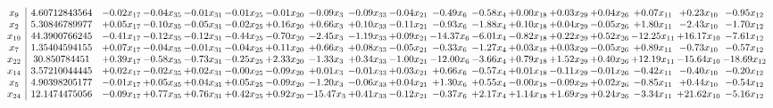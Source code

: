\documentclass[9pt]{article}
\begin{document}
 \[\begin{array}{c| c c@{\hskip 2pt} c@{\hskip 2pt} c@{\hskip 2pt} c@{\hskip 2pt} c@{\hskip 2pt} c@{\hskip 2pt} c@{\hskip 2pt} c@{\hskip 2pt} c@{\hskip 2pt} c@{\hskip 2pt} c@{\hskip 2pt} c@{\hskip 2pt} c@{\hskip 2pt} c@{\hskip 2pt} c@{\hskip 2pt} c@{\hskip 2pt} }
 x_{9}   &  4.60712843564 & -0.02 x_{17} & -0.04 x_{35} & -0.01 x_{31} & -0.01 x_{25} & -0.01 x_{20} & -0.09 x_{3} & -0.09 x_{33} & -0.04 x_{21} & -0.49 x_{6} & -0.58 x_{4} & +  0.00 x_{18} & +  0.03 x_{29} & +  0.04 x_{26} & +  0.07 x_{11} & +  0.23 x_{10} & -0.95 x_{12}\\
 x_{2}   &  5.30846789977 & +  0.05 x_{17} & -0.10 x_{35} & -0.05 x_{31} & -0.02 x_{25} & +  0.16 x_{20} & +  0.66 x_{3} & +  0.10 x_{33} & -0.11 x_{21} & -0.93 x_{6} & -1.88 x_{4} & +  0.10 x_{18} & +  0.04 x_{29} & -0.05 x_{26} & +  1.80 x_{11} & -2.43 x_{10} & -1.70 x_{12}\\
 x_{19}   &  44.3900766245 & -0.41 x_{17} & -0.12 x_{35} & -0.12 x_{31} & -0.44 x_{25} & -0.70 x_{20} & -2.45 x_{3} & -1.19 x_{33} & +  0.09 x_{21} & -14.37 x_{6} & -6.01 x_{4} & -0.82 x_{18} & +  0.22 x_{29} & +  0.52 x_{26} & -12.25 x_{11} & + 16.17 x_{10} & -7.61 x_{12}\\
 x_{7}   &  1.35404594155 & +  0.07 x_{17} & -0.04 x_{35} & -0.01 x_{31} & -0.04 x_{25} & +  0.11 x_{20} & +  0.66 x_{3} & +  0.08 x_{33} & -0.05 x_{21} & -0.33 x_{6} & -1.27 x_{4} & +  0.03 x_{18} & +  0.03 x_{29} & -0.05 x_{26} & +  0.89 x_{11} & -0.73 x_{10} & -0.57 x_{12}\\
 x_{22}   &  30.850784451 & +  0.39 x_{17} & -0.58 x_{35} & -0.73 x_{31} & -0.25 x_{25} & +  2.33 x_{20} & -1.33 x_{3} & +  0.34 x_{33} & -1.00 x_{21} & -12.00 x_{6} & -3.66 x_{4} & +  0.79 x_{18} & +  1.52 x_{29} & +  0.40 x_{26} & + 12.19 x_{11} & -15.64 x_{10} & -18.69 x_{12}\\
 x_{14}   &  3.57210044445 & +  0.02 x_{17} & -0.02 x_{35} & +  0.02 x_{31} & -0.00 x_{25} & -0.09 x_{20} & +  0.01 x_{3} & -0.01 x_{33} & +  0.03 x_{21} & +  0.66 x_{6} & -0.57 x_{4} & +  0.01 x_{18} & -0.11 x_{29} & -0.01 x_{26} & -0.42 x_{11} & -0.40 x_{10} & -0.20 x_{12}\\
 x_{5}   &  4.90398205177 & -0.01 x_{17} & +  0.05 x_{35} & +  0.04 x_{31} & +  0.05 x_{25} & -0.09 x_{20} & -1.20 x_{3} & -0.06 x_{33} & +  0.04 x_{21} & +  1.30 x_{6} & +  0.55 x_{4} & -0.00 x_{18} & -0.09 x_{29} & +  0.02 x_{26} & -0.85 x_{11} & +  0.44 x_{10} & -0.54 x_{12}\\
 x_{24}   &  12.1474475056 & -0.09 x_{17} & +  0.77 x_{35} & +  0.76 x_{31} & +  0.42 x_{25} & +  0.92 x_{20} & -15.47 x_{3} & +  0.41 x_{33} & -0.12 x_{21} & -0.37 x_{6} & +  2.17 x_{4} & +  1.14 x_{18} & +  1.69 x_{29} & +  0.24 x_{26} & -3.34 x_{11} & + 21.62 x_{10} & -5.16 x_{12}\\

\end{array}\]
\end{document}
